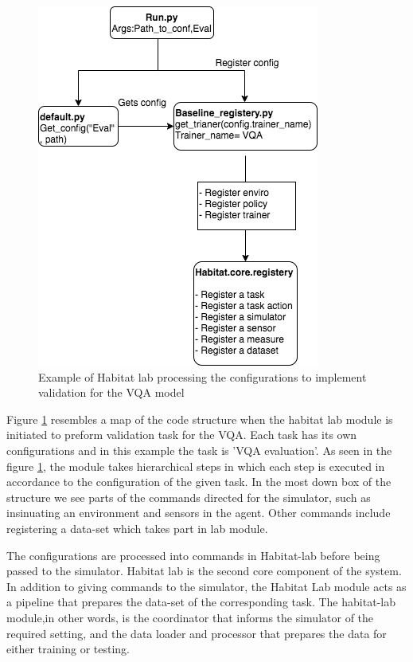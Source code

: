 \documentclass[11pt, a4paper]{article}
\begin{document}
\begin{figure}[H]
\centering
\includegraphics[scale=0.43]{images/configProcess.png}
\caption{Example of Habitat lab processing the configurations to implement validation for the VQA model }
\label{fig:configs}
\end{figure}

Figure \ref{fig:configs} resembles a map of the code structure when the habitat lab module is initiated to preform validation task for the VQA. Each task has its own configurations and in this example the task is 'VQA evaluation'. As seen in the figure \ref{fig:configs}, the module takes hierarchical steps in which each step is executed in accordance to the configuration of the given task. In the most down box of the structure we see parts of the commands directed for the simulator, such as insinuating an environment and sensors in the agent. Other commands include registering a data-set which takes part in lab module. 


The configurations are processed into commands in Habitat-lab before being passed to the simulator. Habitat lab is the second core component of the system. In addition to giving commands to the simulator, the Habitat Lab module acts as a pipeline that prepares the data-set of the corresponding task. The habitat-lab module,in other words, is the coordinator that informs the simulator of the required setting, and the data loader and processor that prepares the data for either training or testing. 
\end{document}
